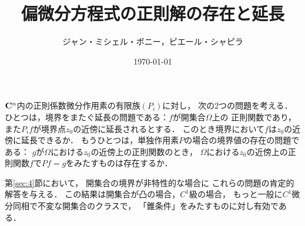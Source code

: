 \newcommand{\cotn}[1][]{\dot{T}^{\ast}{#1}}


\newcommand{\muhom}{\mu hom}
\newcommand{\muHom}[1][]{\mathrm{Hom}^\mu_{\raise1.5ex\hbox to.1em{}#1}}

\newcommand{\mucat}[2][]{\mathsf{D}^{\mathrm{b}}_{#1}(#2)}

\newcommand{\conv}[1][]{\mathbin{\mathop{\circ}\limits_{#1}}}


\newcommand{\lopen}{\mathopen{(}}
\newcommand{\lclosed}{\mathopen{[}}
\newcommand{\ropen}{\mathclose{)}}
\newcommand{\rclosed}{\mathopen{]}}

\newcommand{\sm}{\raisebox{2.33pt}{~\rule{6.4pt}{1.3pt}~}}
\newcommand{\smi}{-}

\newcommand{\smid}{\mathrel{;}}

\newcommand{\torus}{\mathbf{T}}
\newcommand{\eu}{\mathbf{e}}
\newcommand{\rrp}{\rr^{+}}

\newcommand{\sheaf}[1]{\mathcal{#1}}
\newcommand{\structuresheaf}[1]{\sheaf{R}_{#1}}

\DeclareMathOperator{\Car}{Car}


\title{偏微分方程式の正則解の存在と延長}
\author{ジャン・ミシェル・ボニー，ピエール・シャピラ}
\date{\today}

\maketitle

\(\mathbf{C}^{n}\)内の正則係数微分作用素の有限族\((P_{i})\)に対し，
次の2つの問題を考える．
ひとつは，境界をまたぐ延長の問題である：\(f\)が開集合\(\varOmega\)上の
正則関数であり，また\(P_{i}f\)が境界点\(z_{0}\)の近傍に延長されるとする．
このとき境界において\(f\)は\(z_{0}\)の近傍に延長できるか．
もうひとつは，単独作用素\(P\)の場合の境界値の存在の問題である：%
\(g\)が\(\varOmega\)における\(z_{0}\)の近傍上の正則関数のとき，
\(\varOmega\)における\(z_{0}\)の近傍上の正則関数\(f\)で\(Pf=g\)をみたすものは存在するか．

第\ref{sec:4}節において，
開集合の境界が非特性的な場合に
これらの問題の肯定的解答を与える．
この結果は開集合が凸の場合，\(C^1\)級の場合，
もっと一般に\(C^{1}\)微分同相で不変な開集合のクラスで，
「錐条件」をみたすものに対し有効である．

